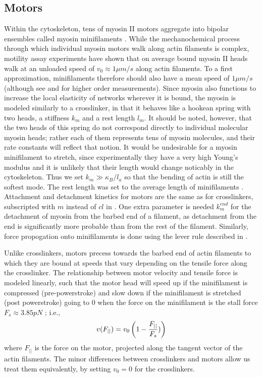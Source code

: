 \documentclass[12pt]{article}
\begin{document}
\subsection{Motors}
Within the cytoskeleton, tens of myosin II motors aggregate into bipolar ensembles called myosin minifilaments
\cite{stam2015}. While the mechanochemical process through which individual myosin motors walk along actin filaments is complex, 
motility assay experiments have shown that on average bound myosin II heads walk at an unloaded speed of $v_0\approx1\mu m/s$ along actin
filaments\cite{finer1994}. To a first approximation, minifilaments therefore should also 
have a mean speed of $1\mu m/s$ (although see \cite{stam2015} and \cite{walcott2012} for higher order measurements). 
Since myosin also functions to increase the local elasticity of networks wherever it is bound, the myosin is modeled
similarly to a crosslinker, in that it behaves like a hookean spring with two heads, a stiffness $k_{m}$ and a rest
length $l_m$. It should be noted, however, that the two heads of this spring do not correspond directly to individual
molecular myosin heads; rather each of them represents tens of myosin molecules, and their rate constants will reflect
that notion. 
It would be undesirable for a myosin minifilament to stretch, 
since experimentally they have a very high
Young's modulus and it is unlikely that their length would change noticably in the cytoskeleton. Thus we set $k_m\gg\kappa_B/l_a$
so that the bending of actin is still the softest mode. 
The rest length was set to the average length of minifilaments \cite{niederman1975}.
Attachment and detachment kinetics for motors are the same as for crosslinkers, subscripted with $m$
instead of $cl$ in . One extra parameter is needed $k_m^{end}$ for the
detachment of myosin from the barbed end of a filament, as detachment from the end is significantly more probable than
from the rest of the filament.
Similarly, force propogation onto minifilaments is done using the lever rule described in .
\par
Unlike crosslinkers, motors precess towards the barbed end of actin filaments to which they are bound 
at speeds that vary depending on the tensile force along the crosslinker. 
The relationship between motor velocity and tensile force is modeled linearly, such that the motor head 
will speed up if the minifilament is
compressed (pre-powerstroke) and slow down if the minifilament is stretched (post powerstroke) going to
$0$ when the force on the minifilament is the stall force $F_s\approx 3.85pN$ \cite{nedelec2002, gordon2012}; i.e.,  
\begin{equation} 
  v(F_{||}) = v_0\left( 1-{F_{||}\over F_s}) \right)
    \label{eqn:myo_vel}
\end{equation} 
where $F_{||}$ is the force on the motor, projected along the tangent vector of the
actin filaments.
The minor differences between crosslinkers and motors allow us treat them equivalently, by 
setting $v_0 = 0$ for the crosslinkers.  
\end{document}
